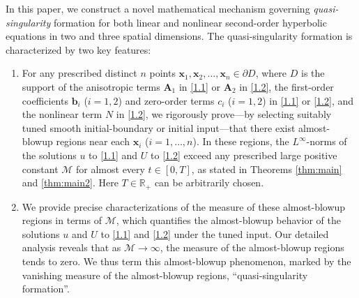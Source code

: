 \documentclass[11pt,reqno,oneside]{amsart}
\numberwithin{equation}{section}
\theoremstyle{definition}
\theoremstyle{remark}
\numberwithin{equation}{section}
\begin{document}
	
	In this paper, we construct a novel mathematical mechanism governing {\it quasi-singularity} formation for both linear and nonlinear second-order hyperbolic equations in two and three spatial dimensions. The quasi-singularity formation is characterized by two key features:
	
	\begin{enumerate}
		\renewcommand{\labelenumi}{(\roman{enumi})}
		\item For any prescribed distinct $n$ points $\mathbf{x}_1,\mathbf{x}_2,\ldots,\mathbf{x}_n \in \partial D$, where $D$ is the support of the anisotropic terms $\mathbf A_1$ in \eqref{1.1} or $\mathbf A_2$ in \eqref{1.2}, the first-order coefficients $\mathbf b_i$ ($i=1,2$) and zero-order terms $c_i$ ($i=1,2$) in \eqref{1.1} or \eqref{1.2}, and the nonlinear term $N$ in \eqref{1.2}, we rigorously prove---by selecting suitably tuned smooth initial-boundary or initial input---that there exist almost-blowup regions near each $\mathbf{x}_i$ ($i=1,\ldots,n$). In these regions, the $L^\infty$-norms of the solutions $u$ to \eqref{1.1} and $U$ to \eqref{1.2} exceed any prescribed large positive constant $\mathcal M$ for almost every $t \in [0,T]$, as stated in Theorems \ref{thm:main} and \ref{thm:main2}. Here $T\in \mathbb R_+$ can be arbitrarily chosen. 
		\item We provide precise characterizations of the measure of these almost-blowup regions in terms of $\mathcal M$, which quantifies the almost-blowup behavior of the solutions $u$ and $U$ to \eqref{1.1} and \eqref{1.2} under the tuned input. Our detailed analysis reveals that as $\mathcal M \to \infty$, the measure of the almost-blowup regions tends to zero. We thus term this almost-blowup phenomenon, marked by the vanishing measure of the almost-blowup regions, ``quasi-singularity formation''.
	\end{enumerate}
	
\end{document}
